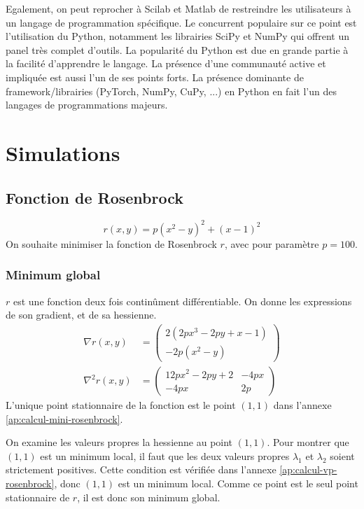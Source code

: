 \documentclass[3p, twocolumn]{elsarticle}
\begin{document}
Egalement, on peut reprocher à Scilab et Matlab de restreindre les utilisateurs à un langage de programmation spécifique. Le concurrent populaire sur ce point est l'utilisation du Python, notamment les librairies SciPy et NumPy qui offrent un panel très complet d'outils. La popularité du Python est due en grande partie à la facilité d'apprendre le langage. La présence d'une communauté active et impliquée est aussi l'un de ses points forts. La présence dominante de framework/librairies (PyTorch, NumPy, CuPy, ...) en Python en fait l'un des langages de programmations majeurs.

\section{Simulations}
\subsection{Fonction de Rosenbrock}
\begin{equation}
    r(x,y)=p(x^2-y)^2+(x-1)^2
    \label{eq:rosenbrock-function}
\end{equation}
On souhaite minimiser la fonction de Rosenbrock $r$, avec pour paramètre $p=100$.

\subsubsection{Minimum global}
    $r$ est une fonction deux fois continûment différentiable. On donne les expressions de son gradient, et de sa hessienne.
    \begin{align*}
        \nabla r(x,y) &=
        \begin{pmatrix}
            2(2px^3-2py+x-1)\\
            -2p(x^2-y)
        \end{pmatrix}\\
        \nabla ^2 r(x,y) &=
        \begin{pmatrix}
            12px^2-2py+2 & -4px\\
            -4px & 2p
        \end{pmatrix}
    \end{align*}
    L'unique point stationnaire de la fonction est le point $(1,1)$ dans l'annexe \ref{ap:calcul-mini-rosenbrock}.

    On examine les valeurs propres la hessienne au point $(1,1)$. Pour montrer que $(1,1)$ est un minimum local, il faut que les deux valeurs propres $\lambda_1$ et $\lambda_2$ soient strictement positives. Cette condition est vérifiée dans l'annexe \ref{ap:calcul-vp-rosenbrock}, donc $(1,1)$ est un minimum local. Comme ce point est le seul point stationnaire de $r$, il est donc son minimum global.
\end{document}
